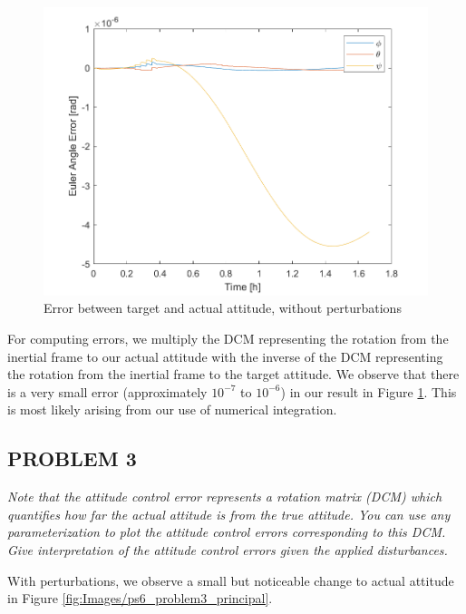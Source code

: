 \begin{figure}[H]
\centering
\includegraphics[scale=0.6]{Images/ps6_problem2_error.png}
\caption{Error between target and actual attitude, without perturbations}
\label{fig:Images/ps6_problem2_error}
\end{figure}

For computing errors, we multiply the DCM representing the rotation from the inertial frame to our actual attitude with the inverse of the DCM representing the rotation from the inertial frame to the target attitude. We observe that there is a very small error (approximately $10^{-7}$ to $10^{-6}$) in our result in Figure \ref{fig:Images/ps6_problem2_error}. This is most likely arising from our use of numerical integration.

\subsection{PROBLEM 3}
\textit{Note that the attitude control error represents a rotation matrix (DCM) which quantifies how far the actual attitude is from the true attitude. You can use any parameterization to plot the attitude control errors corresponding to this DCM. Give interpretation of the attitude control errors given the applied disturbances.}

With perturbations, we observe a small but noticeable change to actual attitude in Figure \ref{fig:Images/ps6_problem3_principal}.

